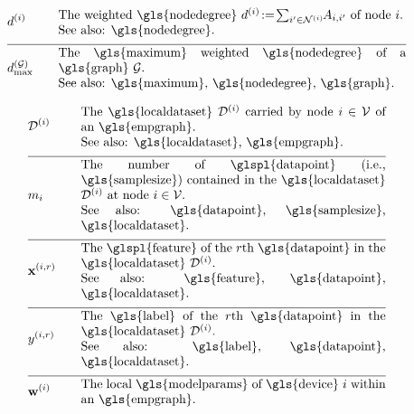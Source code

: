 \begin{align}
	&\nodedegree{\nodeidx} & \quad & \parbox{.80\textwidth}{The weighted \gls{nodedegree} 
		$\nodedegree{\nodeidx}\!\defeq\!\sum_{\nodeidx' \in \neighbourhood{\nodeidx}}\hspace*{-1mm} \edgeweight_{\nodeidx,\nodeidx'}$ of node $\nodeidx$. 
		\\ See also: \gls{nodedegree}. }  \nonumber \\[2mm] \hline \nonumber\\[-5mm]
	&\maxnodedegree^{(\graph)} & \quad & \parbox{.80\textwidth}{The \gls{maximum} weighted \gls{nodedegree} of a \gls{graph} $\graph$.
		\\ See also: \gls{maximum}, \gls{nodedegree}, \gls{graph}. } \nonumber 
\end{align} 

\begin{align} 
	&\localdataset{\nodeidx} & \quad & \parbox{.70\textwidth}{The \gls{localdataset} $\localdataset{\nodeidx}$ carried by 
		node $\nodeidx\in \nodes$ of an \gls{empgraph}.
		\\ See also: \gls{localdataset}, \gls{empgraph}. } \nonumber \\[2mm] \hline \nonumber\\[-5mm] 
	&\localsamplesize{\nodeidx} & \quad & \parbox{.70\textwidth}{The number of \glspl{datapoint} (i.e., \gls{samplesize}) contained in the 
		\gls{localdataset} $\localdataset{\nodeidx}$ at node $\nodeidx\in \nodes$.
		\\ See also: \gls{datapoint}, \gls{samplesize}, \gls{localdataset}. } \nonumber \\[2mm] \hline \nonumber\\[-5mm]
	&\featurevec^{(\nodeidx,\sampleidx)} & \quad & \parbox{.70\textwidth}{The \glspl{feature} of the $\sampleidx$th \gls{datapoint} in 
		the \gls{localdataset} $\localdataset{\nodeidx}$.
		\\ See also: \gls{feature}, \gls{datapoint}, \gls{localdataset}. } \nonumber \\[2mm] \hline \nonumber\\[-5mm]
	&\truelabel^{(\nodeidx,\sampleidx)} & \quad & \parbox{.70\textwidth}{The \gls{label} of the $\sampleidx$th \gls{datapoint} in 
		the \gls{localdataset} $\localdataset{\nodeidx}$.
		\\ See also: \gls{label}, \gls{datapoint}, \gls{localdataset}. } \nonumber \\[2mm] \hline \nonumber\\[-5mm]
	&\localparams{\nodeidx} & \quad & \parbox{.70\textwidth}{The local \gls{modelparams} of \gls{device} $\nodeidx$ within an \gls{empgraph}.
}
\end{align}
